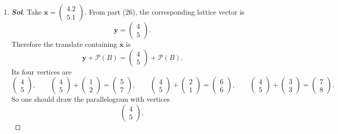 \begin{enumerate}
	\item\begin{proof}[\normalfont\color{magenta}\bfseries Sol]
Take $
\mathbf x=
\begin{pmatrix}
4.2\\
5.1
\end{pmatrix}$. From part (26), the corresponding lattice vector is
\[
\mathbf y=
\begin{pmatrix}
4\\
5
\end{pmatrix}.
\]
Therefore the translate containing \(\mathbf x\) is
\[
\mathbf y+\mathcal P(B)
=
\begin{pmatrix}
4\\
5
\end{pmatrix}
+\mathcal P(B).
\]
Its four vertices are
\[
\begin{pmatrix}
4\\
5
\end{pmatrix},
\qquad
\begin{pmatrix}
4\\
5
\end{pmatrix}
+
\begin{pmatrix}
1\\
2
\end{pmatrix}
=
\begin{pmatrix}
5\\
7
\end{pmatrix},
\qquad
\begin{pmatrix}
4\\
5
\end{pmatrix}
+
\begin{pmatrix}
2\\
1
\end{pmatrix}
=
\begin{pmatrix}
6\\
6
\end{pmatrix},
\qquad
\begin{pmatrix}
4\\
5
\end{pmatrix}
+
\begin{pmatrix}
3\\
3
\end{pmatrix}
=
\begin{pmatrix}
7\\
8
\end{pmatrix}.
\]
So one should draw the parallelogram with vertices
\[
\boxed{
\begin{pmatrix}
	4\\
	5
\end{pmatrix},
}\]
\end{proof}
\end{enumerate}
